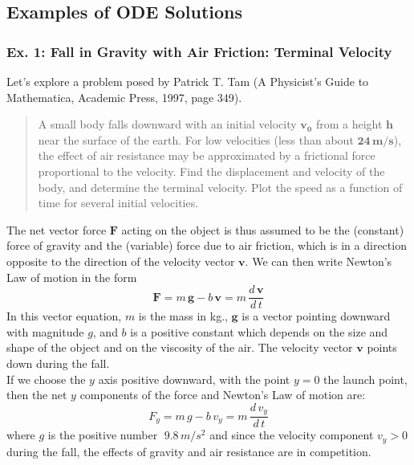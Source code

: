 \documentclass[11pt]{article}
\begin{document}
  

\newpage
\subsection{Examples of ODE Solutions}  
\subsubsection{Ex. 1: Fall in Gravity with Air Friction: Terminal Velocity}
Let's explore a problem posed by Patrick T. Tam (A Physicist's Guide to Mathematica, Academic
  Press, 1997, page 349).
\begin{quote}
A small body falls downward with an initial velocity $\mathbf{v_{0}}$ from a height $\mathbf{h}$
  near the surface of the earth.
For low velocities (less than about $\mathbf{24 \,m/s}$), the effect of air resistance may be
  approximated by a frictional force proportional to the velocity.
Find the displacement and velocity of the body, and determine the terminal velocity.
Plot the speed as a function of time for several initial velocities.
\end{quote}
The net vector force $\mathbf{F}$ acting on the object is thus assumed to be the 
 (constant) force of gravity and the (variable) force due to air friction, 
  which is in a direction opposite to the direction of the velocity vector $\mathbf{v}$.
We can then write Newton's Law of motion in the form
\begin{equation}
\mathbf{F} = m \,\mathbf{g} - b \, \mathbf{v} = m\,\frac{d\,\mathbf{v}}{d\,t}
\end{equation}
In this vector equation, $m$ is the mass in kg., $\mathbf{g}$ is a vector pointing downward
   with magnitude $g$, and $b$ is a positive constant
	which depends on the size and shape of the object and on the viscosity of the air.
The velocity vector $\mathbf{v}$ points down during the fall.\\
	
\noindent If we choose the $y$ axis positive downward, with the point $y = 0$ the
  launch point, then  the net $y$ components of the  force and Newton's Law of motion are:
\begin{equation}
F_{y} =  m \,g - b \,v_{y}  = m\,\frac{d\,v_{y}}{d\,t}
\end{equation}
   where $g$ is the positive number $\;9.8 \,m/s^{2}$ and since the
   velocity component  $v_{y} > 0$ during the fall, the effects of gravity and 
   air resistance are in competition.\\
   
\end{document}
